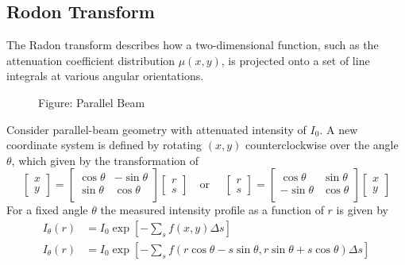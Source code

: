 \documentclass[../../../main.tex]{subfiles}
\begin{document}
\subsection{Rodon Transform}
The Radon transform describes how a two-dimensional function, such as the attenuation coefficient distribution $\mu(x,y)$, is projected onto a set of line integrals at various angular orientations.

\begin{figure*}
    \centering
    \caption*{Figure: Parallel Beam}
\end{figure*}

Consider parallel-beam geometry with attenuated intensity of $I_0$.
A new coordinate system is defined by rotating $(x,y)$ counterclockwise over the angle $\theta$, which given by the transformation of
\begin{equation*}
    \begin{bmatrix}
        x \\y
    \end{bmatrix}
    =
    \begin{bmatrix}
        \cos \theta & -\sin \theta \\
        \sin \theta & \cos \theta  \\
    \end{bmatrix}
    \begin{bmatrix}
        r \\s
    \end{bmatrix}
    \quad \text{or }\quad
    \begin{bmatrix}
        r \\s
    \end{bmatrix}
    =
    \begin{bmatrix}
        \cos \theta  & \sin \theta \\
        -\sin \theta & \cos \theta \\
    \end{bmatrix}
    \begin{bmatrix}
        x \\y
    \end{bmatrix}
\end{equation*}
For a fixed angle $\theta$ the measured intensity profile as a function of $r$ is given by
\begin{align*}
    I_\theta(r) & = I_0 \exp \left[ -\sum_s f(x,y)\Delta s \right]                                                                    \\
    I_\theta(r) & = I_0 \exp \left[ -\sum_s f \left( r \cos \theta-s \sin \theta,r \sin \theta+s \cos \theta \right) \Delta s \right]
\end{align*}
\end{document}
